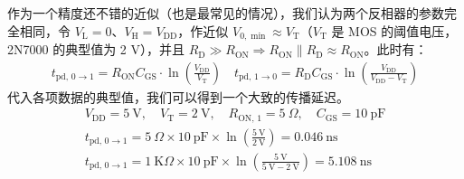 \documentclass[UTF8]{report}
\def\pF{\ \mathrm{pF}}
\def\kO{\ \mathrm{K}\Omega}
\theoremstyle{MyLineTheoremStyle} %
\theoremstyle{MyBlockTheoremStyle} %
\theoremstyle{MySubsubsectionStyle} %
\begin{document}

作为一个精度还不错的近似（也是最常见的情况），我们认为两个反相器的参数完全相同，令 $V_{\text{L}} = 0$、$V_{\text{H}} = V_{\text{DD}}$，作近似 $V_{0,\min} \approx V_{\text{T}}$（$V_{\text{T}}$ 是 MOS 的阈值电压，2N7000 的典型值为 2 V），并且 $R_{\text{D}} \gg R_{\text{ON}} \Longrightarrow R_{\text{ON}} \parallel R_{\text{D}} \approx R_{\text{ON}}$。此时有：
\begin{gather}
    t_\text{pd, $0\to 1$} = R_{\text{ON}} C_{\text{GS}}\cdot 
    \ln \left(\frac{V_{\text{DD}}}{V_\text{T}}\right) \quad 
    t_\text{pd, $1\to 0$} = R_{\text{D}} C_{\text{GS}}\cdot \ln \left(\frac{V_{\text{DD}}}{V_{\text{DD}} - V_\text{T}}\right)
\end{gather}
代入各项数据的典型值，我们可以得到一个大致的传播延迟。
\begin{gather}
V_{\text{DD}} = 5 \ \mathrm{V},\quad V_\text{T} = 2 \ \mathrm{V} ,\quad R_{\text{ON, 1}} = 5 \ \Omega,\quad C_{\text{GS}} = 10 \ \mathrm{pF} \\ 
t_\text{pd, $0\to 1$} = 5 \ \Omega\times 10 \pF \times \ln \left(\frac{5 \ \mathrm{V}}{2 \ \mathrm{V}}\right) = 0.046 \ \mathrm{ns}  \\
t_\text{pd, $0\to 1$} = 1 \kO\times 10 \pF \times \ln \left(\frac{5 \ \mathrm{V}}{5 \ \mathrm{V} - 2 \ \mathrm{V}}\right) = 5.108 \ \mathrm{ns}
\end{gather}


\end{document}

